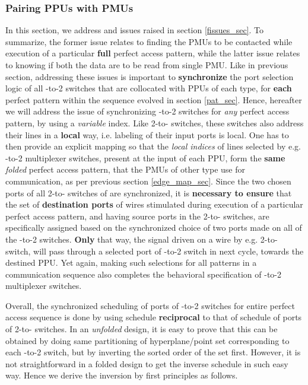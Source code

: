 \documentclass[12pt]{article}
\begin{document}
\subsubsection{Pairing PPUs with PMUs}
\label{mem_indx_sec}
In this section, we address  and  issues raised in section
\ref{fissues_sec}. To summarize, the former issue relates to finding the
PMUs to be contacted while execution of a particular \textbf{full}
perfect access pattern, while the latter issue relates to knowing if both
the data are to be read from single PMU. Like in
previous section,
addressing these issues is important to \textbf{synchronize} the
port selection logic of all -to-2 switches that are collocated
with PPUs of each type, for \textbf{each} perfect pattern
within the sequence
evolved in section \ref{pat_sec}. Hence, hereafter we will address
the issue of synchronizing -to-2 switches for \textit{any}
perfect access pattern, by using a \textit{variable} index.
Like 2-to-
switches, these switches also address their lines in
a \textbf{local} way, i.e. labeling of their input ports
is local. One has to
then provide an explicit mapping so that the \textit{local indices} of
lines selected by e.g. -to-2 multiplexer switches, present at
the input of each PPU, form the \textbf{same}
\textit{folded}
perfect access pattern, that the PMUs of other type
use for communication, as per
previous section \ref{edge_map_sec}. Since the two chosen ports of all
2-to- switches of are synchronized, it is \textbf{necessary to ensure}
that the set of \textbf{destination ports} of wires stimulated during execution of a
particular perfect access pattern, and having source ports in the
2-to- switches, are specifically assigned based on the synchronized
choice of two ports made on all of the -to-2 switches.
\textbf{Only} that way, the signal driven on a wire by e.g.
2-to- switch, will pass through a selected port of
-to-2 switch in next cycle, towards the destined PPU. Yet again, making such selections for all patterns in a communication
sequence also completes the behavioral specification of -to-2
multiplexer switches.

Overall, the synchronized scheduling of ports of -to-2
switches for entire perfect access sequence is done by
using schedule \textbf{reciprocal} to that of schedule of ports of
2-to- switches. In an \textit{unfolded} design, it is easy to
prove that this can be obtained by doing same partitioning of
hyperplane/point set corresponding to each -to-2
switch, but by inverting the sorted order of the set first. However, it is
not straightforward in a folded design to get the inverse schedule in such
easy way. Hence we derive the inversion by first principles as follows.
\end{document}
